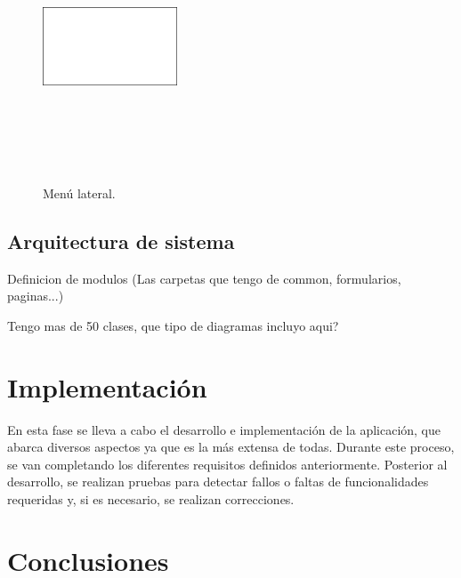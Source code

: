 \documentclass[a4paper, 12pt]{article}
\begin{document}
\begin{figure}[H]
   	\begin{minipage}{0.48\textwidth}
		\begin{center}
			{\includegraphics[height=8cm, width=4cm]{White.png}\par}
			\caption{Menú lateral.}
			\medskip
		\end{center}  
	\end{minipage}\hfill
\end{figure}



\newpage
\subsection{Arquitectura de sistema}
Definicion de modulos (Las carpetas que tengo de common, formularios, paginas...)

Tengo mas de 50 clases, que tipo de diagramas incluyo aqui?



\newpage
\section{Implementación}

En esta fase se lleva a cabo el desarrollo e implementación de la aplicación, que abarca diversos aspectos ya que es la más extensa de todas. Durante este proceso, se van completando los diferentes requisitos definidos anteriormente.  Posterior al desarrollo, se realizan pruebas para detectar fallos o faltas de funcionalidades requeridas y, si es necesario, se realizan correcciones.

\newpage
\section{Conclusiones}
\end{document}
